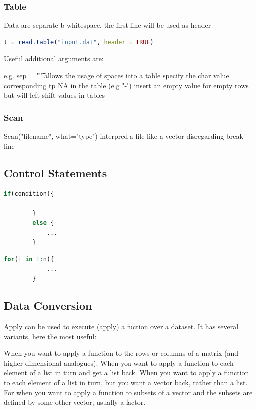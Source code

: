 	\subsubsection{Table}
	Data are separate b whitespace, the first line will be used as header
	\begin{lstlisting}[language=R]
		t = read.table("input.dat", header = TRUE)
	\end{lstlisting}
	

	Useful additional arguments are:
	\begin{itemize}
		e.g. sep = "\t" allows the usage of spaces into a table
	 specify the char value corresponding tp NA in the table (e.g "-")
	insert an empty value for empty rows but will left shift values in tables
	\end{itemize}
	
	\subsubsection{Scan}
	Scan("filename", what="type") interpred a file like a vector disregarding break line
	
	\subsection{Control Statements}
	\begin{lstlisting}[language=R]
		if(condition){
			...	
		}
		else {
			...
		}
	\end{lstlisting}
	
	\begin{lstlisting}[language=R]
		for(i in 1:n){
			...	
		}
	\end{lstlisting}
	
	\subsection{Data Conversion}
	Apply can be used to execute (apply) a fuction over a dataset. It has several variants, here the most useful:
	\begin{itemize}
		 When you want to apply a function to the rows or columns of a matrix (and higher-dimensional analogues).
		 When you want to apply a function to each element of a list in turn and get a list back.
		 When you want to apply a function to each element of a list in turn, but you want a vector back, rather than a list.
		 For when you want to apply a function to subsets of a vector and the subsets are defined by some other vector, usually a factor.
	\end{itemize}
	
